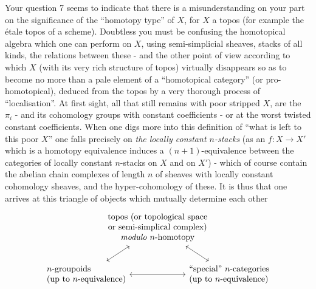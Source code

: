 \label{sec:app15}%
Your question 7 seems to indicate that there is a misunderstanding on your part on the significance of the ``homotopy type'' of $X$, for $X$ a topos (for example the étale topos of a scheme). Doubtless you must be confusing the homotopical algebra which one can perform on $X$, using semi-simplicial sheaves, stacks of all kinds, the relations between these - and the other point of view according to which $X$ (with its very rich structure of topos) virtually disappears so as to become no more than a pale element of a ``homotopical category'' (or pro-homotopical), deduced from the topos by a very thorough process of ``localisation''. At first sight, all that still remains with poor stripped $X$, are the $\pi_i$ - and its cohomology groups with constant coefficients - or at the worst twisted constant coefficients. When one digs more into this definition of ``what is left to this poor $X$'' one falls precisely on \emph{the locally constant $n$-stacks} (as an $f: X \to X'$ which is a homotopy equivalence induces a $(n + 1)$-equivalence between the categories of locally constant $n$-stacks on $X$ and on $X'$) - which of course contain the abelian chain complexes of length $n$ of sheaves with locally constant cohomology sheaves, and the hyper-cohomology of these. It is thus that one arrives at this triangle of objects which mutually determine each other
\[\begin{tikzcd}[column sep=-3em,every arrow/.append style={<->}]
 & \begin{tabular}{@{}c@{}}
    topos (or topological space\\
    or semi-simplical complex)\\
    \textit{modulo} $n$-homotopy
   \end{tabular}
   \arrow[dl]\arrow[dr]&\\
 \begin{tabular}{@{}l@{}}
    $n$-groupoids\\
    (up to $n$-equivalence)
   \end{tabular}
   \arrow[rr]&
 & \begin{tabular}{@{}l@{}}
    ``special'' $n$-categories\\
    (up to $n$-equivalence)
   \end{tabular}
\end{tikzcd}
\]
